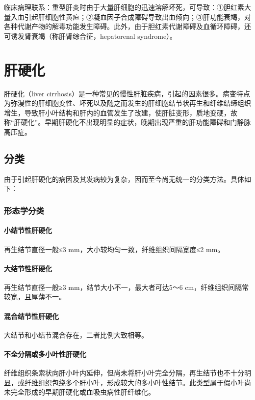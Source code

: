 临床病理联系：重型肝炎时由于大量肝细胞的迅速溶解坏死，可导致：①胆红素大量入血引起肝细胞性黄疸；②凝血因子合成障碍导致出血倾向；③肝功能衰竭，对各种代谢产物的解毒功能发生障碍。此外，由于胆红素代谢障碍及血循环障碍，还可诱发肾衰竭（称肝肾综合征，hepatorenal
syndrome）。

\section{肝硬化}

肝硬化（liver
cirrhosis）是一种常见的慢性肝脏疾病，引起的因素很多。病变特点为弥漫性的肝细胞变性、坏死以及随之而发生的肝细胞结节状再生和纤维结缔组织增生，导致肝小叶结构和肝内的血管发生了改建，使肝脏变形，质地变硬，故称“肝硬化”。早期肝硬化不出现明显的症状，晚期出现严重的肝功能障碍和门静脉高压症。

\subsection{分类}

由于引起肝硬化的病因及其发病较为复杂，因而至今尚无统一的分类方法。具体如下：

\subsubsection{形态学分类}

\paragraph{小结节性肝硬化}
再生结节直径一般≤3
mm，大小较均匀一致，纤维组织间隔宽度≤2 mm。

\paragraph{大结节性肝硬化}
再生结节直径一般≥3
mm，结节大小不一，最大者可达5～6 cm，纤维组织间隔常较宽，且厚薄不一。

\paragraph{混合结节性肝硬化}
大结节和小结节混合存在，二者比例大致相等。

\paragraph{不全分隔或多小叶性肝硬化}
纤维组织条索状向肝小叶内延伸，但尚未将肝小叶完全分隔，再生结节也不十分明显，或纤维组织包绕多个肝小叶，形成较大的多小叶性结节。此类型属于假小叶尚未完全形成的早期肝硬化或血吸虫病性肝纤维化。

